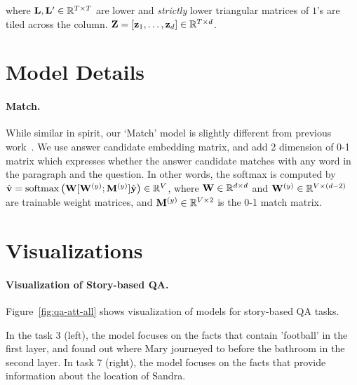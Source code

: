 \documentclass[table]{article}
\begin{document}
where ${\bf L}, {\bf L}' \in \mathbb{R}^{T \times T} $ are lower and \emph{strictly} lower triangular matrices of $1$'s are tiled across the column. ${\bf Z} = [{\bf z}_1, \dots , {\bf z}_d] \in \mathbb{R}^{T \times d}$. 
 
\section{Model Details}\label{sec:app-d}

\paragraph{Match.}
While similar in spirit, our `Match' model is slightly different from previous work~\citep{bordes2016learning, perez2016gated}. 
We use answer candidate embedding matrix, and add 2 dimension of 0-1 matrix which expresses whether the answer candidate matches with any word in the paragraph and the question. In other words, the softmax is computed by
$\hat{\bf v} = \mathrm{softmax}\left( {\bf W} [{\bf W}^{(y)};{\bf M}^{(y)}] \hat{\bf y} \right) \in \mathbb{R}^V$, where ${\bf W} \in \mathbb{R}^{d \times d}$ and ${\bf W}^{(y)} \in \mathbb{R}^{V \times (d-2)}$ are trainable weight matrices, and ${\bf M}^{(y)}\in \mathbb{R}^{V \times 2} $ is the 0-1 match matrix.


 
\section{Visualizations}\label{sec:app-c}


\paragraph{Visualization of Story-based QA.}
Figure~\ref{fig:qa-att-all} shows visualization of models for story-based QA tasks.

In the task 3 (left), the model focuses on the facts that contain 'football' in the first layer, and found out where Mary journeyed to before the bathroom in the second layer. In task 7 (right), the model focuses on the facts that provide information about  the location of Sandra.
\end{document}
